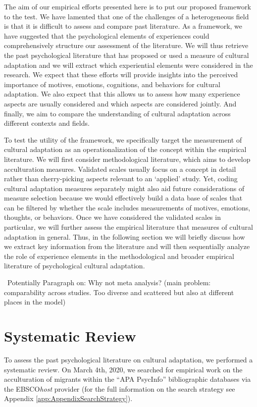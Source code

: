 \documentclass[man, 12pt, a4paper]{apa7}
\newcommand\Question[1][2ex]{%
  \renewcommand\stacktype{L}%
  \scaleto{\stackon[1.3pt]{\color{red}$\triangle$}{\tiny\bfseries ?}}{#1}}%
\begin{document}
The aim of our empirical efforts presented here is to put our proposed framework to the test. We have lamented that one of the challenges of a heterogeneous field is that it is difficult to assess and compare past literature. As a framework, we have suggested that the psychological elements of experiences could comprehensively structure our assessment of the literature. We will thus retrieve the past psychological literature that has proposed or used a measure of cultural adaptation and we will extract which experiential elements were considered in the research. We expect that these efforts will provide insights into the perceived importance of motives, emotions, cognitions, and behaviors for cultural adaptation. We also expect that this allows us to assess how many experience aspects are usually considered and which aspects are considered jointly. And finally, we aim to compare the understanding of cultural adaptation across different contexts and fields. 

To test the utility of the framework, we specifically target the measurement of cultural adaptation as an operationalization of the concept within the empirical literature. We will first consider methodological literature, which aims to develop acculturation measures. Validated scales usually focus on a concept in detail rather than cherry-picking aspects relevant to an `applied' study. Yet, coding cultural adaptation measures separately might also aid future considerations of measure selection because we would effectively build a data base of scales that can be filtered by whether the scale includes measurements of motives, emotions, thoughts, or behaviors. Once we have considered the validated scales in particular, we will further assess the empirical literature that measures of cultural adaptation in general. Thus, in the following section we will briefly discuss how we extract key information from the literature and will then sequentially analyze the role of experience elements in the methodological and broader empirical literature of psychological cultural adaptation.

\Question\ Potentially Paragraph on: Why not meta analysis? (main problem: comparability across studies. Too diverse and scattered but also at different places in the model)

\section{Systematic Review}
To assess the past psychological literature on cultural adaptation, we performed a systematic review. On March 4th, 2020, we searched for empirical work on the acculturation of migrants within the ``APA PsycInfo'' bibliographic databases via the EBSCO\textit{host} provider (for the full information on the search strategy see Appendix \ref{app:AppendixSearchStrategy}). 
\end{document}
